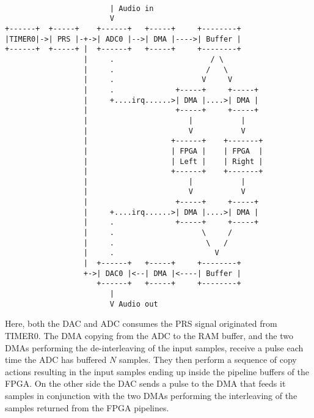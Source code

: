 \begin{verbatim}

                        | Audio in
                        V
+------+  +-----+    +------+   +-----+     +--------+
|TIMER0|->| PRS |-+->| ADC0 |-->| DMA |---->| Buffer |
+------+  +-----+ |  +------+   +-----+     +--------+
                  |     .                      / \
                  |     .                     /   \
                  |     .                    V     V
                  |     .              +-----+     +-----+
                  |     +....irq......>| DMA |....>| DMA |
                  |                    +-----+     +-----+
                  |                       |           |
                  |                       V           V
                  |                   +------+    +-------+
                  |                   | FPGA |    | FPGA  |
                  |                   | Left |    | Right |
                  |                   +------+    +-------+
                  |                       |           |
                  |                       V           V
                  |                    +-----+     +-----+
                  |     +....irq......>| DMA |....>| DMA |
                  |     .              +-----+     +-----+
                  |     .                    \     /
                  |     .                     \   /
                  |     .                       V
                  |  +------+   +-----+     +--------+
                  +->| DAC0 |<--| DMA |<----| Buffer |
                     +------+   +-----+     +--------+
                        |
                        V Audio out
\end{verbatim}

Here, both the DAC and ADC consumes the PRS signal originated from TIMER0. The
DMA copying from the ADC to the RAM buffer, and the two DMAs performing the
de-interleaving of the input samples, receive a pulse each time the ADC has
buffered $N$ samples. They then perform a sequence of copy actions resulting
in the input samples ending up inside the pipeline buffers of the FPGA. On the
other side the DAC sends a pulse to the DMA that feeds it samples in conjunction
with the two DMAs performing the interleaving of the samples returned from the
FPGA pipelines.
